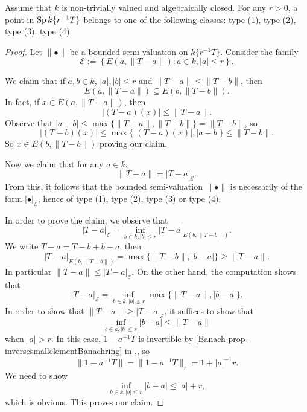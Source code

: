 \begin{proposition}
    Assume that $k$ is non-trivially valued and algebraically closed.
    For any $r>0$, a point in $\operatorname{Sp} k\{r^{-1}T\}$ belongs to one of the following classes: type (1), type (2), type (3), type (4).
\end{proposition}
\begin{proof}
    Let $\|\bullet\|$ be a bounded semi-valuation on $k\{r^{-1}T\}$.
    Consider the family
    \[
        \mathcal{E}:=\left\{ E(a, \|T-a\|) : a\in k, |a|\leq r \right\}.  
    \]

    We claim that if $a,b\in k$, $|a|, |b|\leq r$ and $\|T-a\|\leq \|T-b\|$, then 
    \[
        E(a, \|T-a\|)\subseteq E(b, \|T-b\|). 
    \]
    In fact, if $x\in E(a, \|T-a\|)$, then
    \[
        |(T-a)(x)|\leq \|T-a\|.
    \]
    Observe that $|a-b|\leq \max \{\|T-a\|,\|T-b\|\}=\|T-b\|$, so
    \[
        |(T-b)(x)|\leq \max \{|(T-a)(x)|,|a-b|\} \leq \|T-b\|. 
    \]
    So $x\in E(b, \|T-b\|)$ proving our claim.

    Now we claim that for any $a\in k$,
    \[
        \|T-a\|=|T-a|_{\mathcal{E}}.
    \]
    From this, it follows that the bounded semi-valuation $\|\bullet\|$ is necessarily of the form $|\bullet|_{\mathcal{E}}$, hence of type (1), type (2), type (3) or type (4).

    In order to prove the claim, we observe that
    \[
        |T-a|_{\mathcal{E}}=\inf_{b\in k,|b|\leq r} |T-a|_{E(b,\|T-b\|)}. 
    \]
    We write $T-a=T-b+b-a$, then
    \[
        |T-a|_{E(b,\|T-b\|)}=\max\{\|T-b\|,|b-a|\}\geq \|T-a\|.
    \]
    In particular $\|T-a\|\leq |T-a|_{\mathcal{E}}$.
    On the other hand, the computation shows that
    \[
        |T-a|_{\mathcal{E}}=  \inf_{b\in k,|b|\leq r} \max\{\|T-a\|,|b-a|\}.
    \]
    In order to show that $\|T-a\|\geq |T-a|_{\mathcal{E}}$,
    it suffices to show that 
    \[
        \inf_{b\in k,|b|\leq r}|b-a|\leq \|T-a\|
    \]
    when $|a|>r$. In this case, $1-a^{-1}T$ is invertible by \cref{Banach-prop-inversesmallelementBanachring} in ., so
    \[
         \|1-a^{-1}T\|=\|1-a^{-1}T\|_r=1+|a|^{-1}r. 
    \]
    We need to show 
    \[
        \inf_{b\in k,|b|\leq r}|b-a|\leq |a|+r,
    \]
    which is obvious. This proves our claim.
    
\end{proof}


